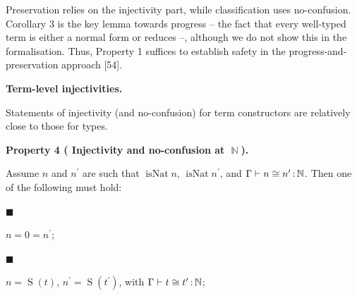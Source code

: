 \documentclass[10pt,a4paper]{amsart}
\begin{document}
 
 
 
Preservation relies on the injectivity part, while classification uses no-confusion. Corollary 3 is the key lemma towards progress – the fact that every well-typed term is either a normal form or reduces –, although we do not show this in the formalisation. Thus, Property 1 suffices to establish safety in the progress-and-preservation approach [54].\par
 
 
 
 
\par\medskip\noindent\textbf{Term-level injectivities.}\par
 
 
Statements of injectivity (and no-confusion) for term constructors are relatively close to those for types.\par
 
 
 
\par\medskip\noindent\textbf{Property 4 (  Injectivity and no-confusion at $\operatorname{\mathbb{N}}$).}\par
 
 
Assume $n$ and $n^{\prime}$ are such that $\operatorname{isNat}n$, $\operatorname{isNat}n^{\prime}$, and $\Gamma\vdash n\mathrel{\raisebox{-0.5pt}{$\cong$}}n^{\prime}\operatorname{%
\mathrel{:}}\operatorname{\mathbb{N}}$. Then one of the following must hold:\par
  
\par\noindent  $\blacksquare$ 
 
$n=0=n^{\prime}$;\par
 
 
 
\par\noindent  $\blacksquare$ 
 
$n=\operatorname{S}(t)$, $n^{\prime}=\operatorname{S}(t^{\prime})$, with $\Gamma\vdash t\mathrel{\raisebox{-0.5pt}{$\cong$}}t^{\prime}\operatorname{%
\mathrel{:}}\operatorname{\mathbb{N}}$;\par
 
\end{document}

